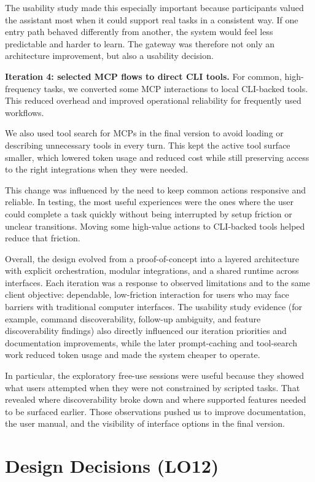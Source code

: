 \documentclass{article}
\begin{document}
The usability study made this especially important because participants valued
the assistant most when it could support real tasks in a consistent way. If one
entry path behaved differently from another, the system would feel less
predictable and harder to learn. The gateway was therefore not only an
architecture improvement, but also a usability decision.

\medskip
\noindent\textbf{Iteration 4: selected MCP flows to direct CLI tools.} For common,
high-frequency tasks, we converted some MCP interactions to local CLI-backed
tools. This reduced overhead and improved operational reliability for frequently
used workflows.

We also used tool search for MCPs in the final version to avoid loading or
describing unnecessary tools in every turn. This kept the active tool surface
smaller, which lowered token usage and reduced cost while still preserving access
to the right integrations when they were needed.

This change was influenced by the need to keep common actions responsive and
reliable. In testing, the most useful experiences were the ones where the user
could complete a task quickly without being interrupted by setup friction or
unclear transitions. Moving some high-value actions to CLI-backed tools helped
reduce that friction.

\medskip
Overall, the design evolved from a proof-of-concept into a layered architecture
with explicit orchestration, modular integrations, and a shared runtime across
interfaces. Each iteration was a response to observed limitations and to the
same client objective: dependable, low-friction interaction for users who may
face barriers with traditional computer interfaces. The usability study evidence
(for example, command discoverability, follow-up ambiguity, and feature
discoverability findings) also directly influenced our iteration priorities and
documentation improvements, while the later prompt-caching and tool-search work
reduced token usage and made the system cheaper to operate.

\medskip
In particular, the exploratory free-use sessions were useful because they showed
what users attempted when they were not constrained by scripted tasks. That
revealed where discoverability broke down and where supported features needed to
be surfaced earlier. Those observations pushed us to improve documentation, the
user manual, and the visibility of interface options in the final version.

\section{Design Decisions (LO12)}
\end{document}
